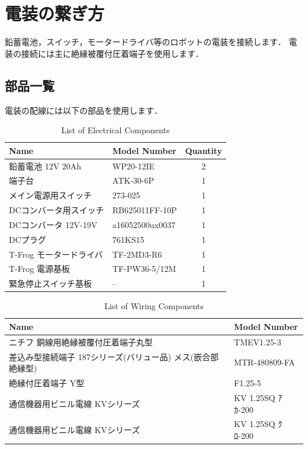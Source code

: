 \documentclass[{../../master}]{subfiles}
\begin{document}
  \section{電装の繋ぎ方}

  鉛蓄電池，スイッチ，モータードライバ等のロボットの電装を接続します．
  電装の接続には主に絶縁被覆付圧着端子を使用します．

  \subsection{部品一覧}
  
  電装の配線には以下の部品を使用します．

  \begin{table}[ht]
    \begin{center}
      \begin{tabular}{|l|l|c|}
        \hline
          Name & Model Number & Quantity \\ \hline
          鉛蓄電池 12V 20Ah & WP20-12IE & 2 \\ \hline
          端子台 & ATK-30-6P & 1  \\ \hline
          メイン電源用スイッチ & 273-025 & 1  \\ \hline
          DCコンバータ用スイッチ & RB625011FF-10P & 1  \\ \hline
          DCコンバータ 12V-19V & a16052500ux0037 & 1  \\ \hline
          DCプラグ & 761KS15 & 1  \\ \hline
          T-Frog モータードライバ & TF-2MD3-R6 & 1  \\ \hline
          T-Frog 電源基板 & TF-PW36-5/12M & 1  \\ \hline
          緊急停止スイッチ基板 & -- & 1 \\ \hline
        \end{tabular}
    \end{center}
    \caption{List of Electrical Components}
    \label{tab:list_of_electrical_components}
  \end{table}

  \begin{table}[ht]
    \begin{center}
      \begin{tabular}{|l|l|}
        \hline
        Name & Model Number \\ \hline
        ニチフ 銅線用絶縁被覆付圧着端子丸型 & TMEV1.25-3 \\ \hline
        差込み型接続端子 187シリーズ(バリュー品) メス(嵌合部絶縁型) & MTR-480809-FA \\ \hline
        絶縁付圧着端子 Y型 & F1.25-5 \\ \hline
        通信機器用ビニル電線 KVシリーズ & KV 1.25SQ ｱｶ-200 \\ \hline
        通信機器用ビニル電線 KVシリーズ & KV 1.25SQ ｸﾛ-200 \\ \hline
      \end{tabular}
    \end{center}
    \caption{List of Wiring Components}
    \label{tab:list_of_wiring_components}
  \end{table}
\end{document}
